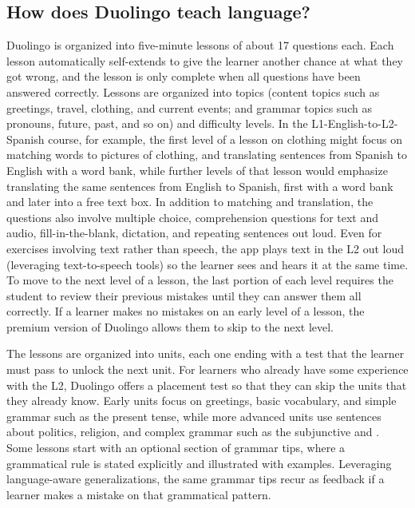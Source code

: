 \subsection{How does Duolingo teach language?}

Duolingo is organized into five-minute lessons of about 17 questions each.   Each lesson automatically self-extends to give the learner another chance at what they got wrong, and the lesson is only complete when all questions have been answered correctly.  Lessons are organized into topics (content topics such as greetings, travel, clothing, and current events; and grammar topics such as pronouns, future, past, and so on) and difficulty levels.  In the L1-English-to-L2-Spanish course, for example, the first level of a lesson on clothing might focus on matching words to pictures of clothing, and translating sentences from Spanish to English with a word bank, while further levels of that lesson would emphasize translating the same sentences from English to Spanish, first with a word bank and later into a free text box.  In addition to matching and translation, the questions also involve multiple choice, comprehension questions for text and audio, fill-in-the-blank, dictation, and repeating sentences out loud.  Even for exercises involving text rather than speech, the app plays text in the L2 out loud (leveraging text-to-speech tools) so the learner sees and hears it at the same time.  To move to the next level of a lesson, the last portion of each level requires the student to review their previous mistakes until they can answer them all correctly.  If a learner makes no mistakes on an early level of a lesson, the premium version of Duolingo allows them to skip to the next level.  


The lessons are organized into units, each one ending with a test that the learner must pass to unlock the next unit.   For learners who already have some experience with the L2, Duolingo offers a placement test so that they can skip the units that they already know. Early units focus on greetings, basic vocabulary, and simple grammar such as the present tense, while more advanced units use sentences about politics, religion, and complex grammar such as the subjunctive and .  Some lessons start with an optional section of grammar tips, where a grammatical rule is stated explicitly and illustrated with examples. Leveraging language-aware generalizations, the same grammar tips recur as feedback if a learner makes a mistake on that grammatical pattern.  


